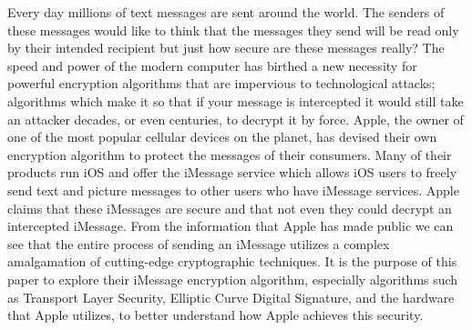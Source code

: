 Every day millions of text messages are sent around the world.  The senders of these messages would like to think that the messages they send will be read only by their intended recipient but just how secure are these messages really?  The speed and power of the modern computer has birthed a new necessity for powerful encryption algorithms that are impervious to technological attacks; algorithms which make it so that if your message is intercepted it would still take an attacker decades, or even centuries, to decrypt it by force.  Apple, the owner of one of the most popular cellular devices on the planet, has devised their own encryption algorithm to protect the messages of their consumers.  Many of their products run iOS and offer the iMessage service which allows iOS users to freely send text and picture messages to other users who have iMessage services.  Apple claims that these iMessages are secure and that not even they could decrypt an intercepted iMessage.  From the information that Apple has made public we can see that the entire process of sending an iMessage utilizes a complex amalgamation of cutting-edge cryptographic techniques.  It is the purpose of this paper to explore their iMessage encryption algorithm, especially algorithms such as Transport Layer Security, Elliptic Curve Digital Signature, and the hardware that Apple utilizes, to better understand how Apple achieves this security.
